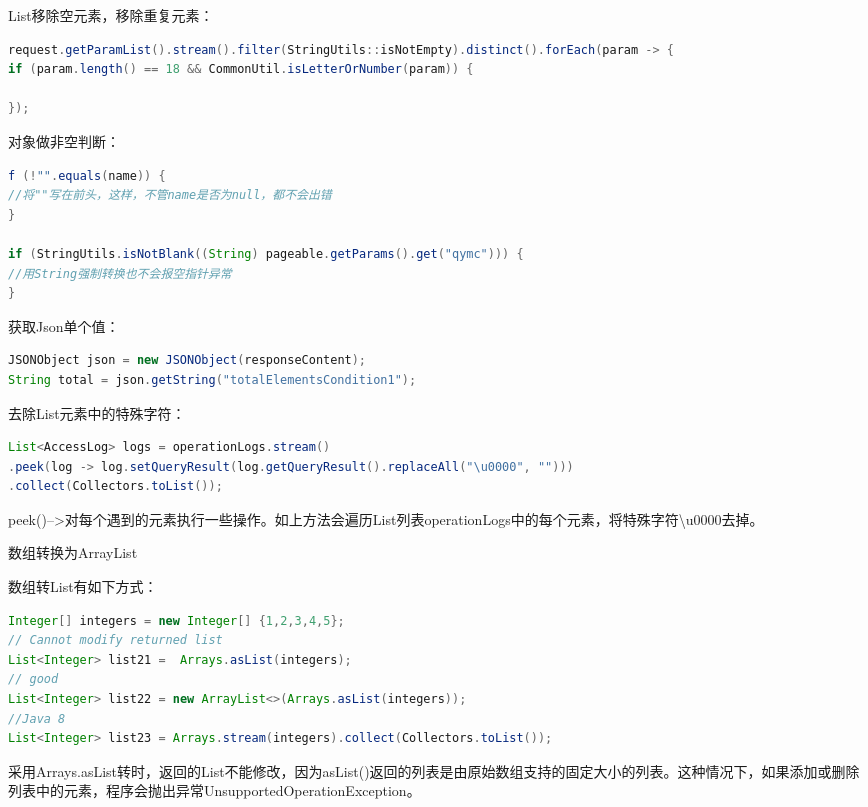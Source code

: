 \documentclass[11pt,fleqn]{book}
\makeatletter
\numberwithin{dummy}{section}
\theoremstyle{ocrenumbox}
\theoremstyle{blacknumex}
\theoremstyle{blacknumbox}
\theoremstyle{ocrenum}
\renewcommand\paragraph{\@startsection{paragraph}{4}{\z@}
	{-2ex \@plus-.2ex \@minus .2ex}
	{.1ex}
	{\normalfont\small\sffamily\bfseries}}
\newlength\esp
\makeatother
\begin{document}
List移除空元素，移除重复元素：

\begin{lstlisting}[language=Java]
request.getParamList().stream().filter(StringUtils::isNotEmpty).distinct().forEach(param -> {
if (param.length() == 18 && CommonUtil.isLetterOrNumber(param)) {

});
\end{lstlisting}

对象做非空判断：

\begin{lstlisting}[language=Java]
f (!"".equals(name)) {
//将""写在前头，这样，不管name是否为null，都不会出错
}

if (StringUtils.isNotBlank((String) pageable.getParams().get("qymc"))) {
//用String强制转换也不会报空指针异常
} 
\end{lstlisting}

获取Json单个值：

\begin{lstlisting}[language=Java]
JSONObject json = new JSONObject(responseContent);
String total = json.getString("totalElementsCondition1");
\end{lstlisting}

去除List元素中的特殊字符：

\begin{lstlisting}[language=Java]
List<AccessLog> logs = operationLogs.stream()
.peek(log -> log.setQueryResult(log.getQueryResult().replaceAll("\u0000", "")))
.collect(Collectors.toList());
\end{lstlisting}

peek()-->对每个遇到的元素执行一些操作。如上方法会遍历List列表operationLogs中的每个元素，将特殊字符\textbackslash u0000去掉。

\paragraph{数组转换为ArrayList}

数组转List有如下方式：

\begin{lstlisting}[language=Java]
Integer[] integers = new Integer[] {1,2,3,4,5};
// Cannot modify returned list
List<Integer> list21 =  Arrays.asList(integers); 
// good
List<Integer> list22 = new ArrayList<>(Arrays.asList(integers)); 
//Java 8
List<Integer> list23 = Arrays.stream(integers).collect(Collectors.toList()); 
\end{lstlisting}

采用Arrays.asList转时，返回的List不能修改，因为asList()返回的列表是由原始数组支持的固定大小的列表。这种情况下，如果添加或删除列表中的元素，程序会抛出异常UnsupportedOperationException。
\end{document}
